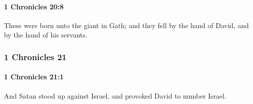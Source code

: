 		\paragraph{1 Chronicles 20:8} %
			\label{1CHRONICLES-20-8}

			These were born unto the giant in Gath; and they fell by the hand of David, and by the hand of his servants.

	\subsubsection{1 Chronicles 21} %
		\label{1CHRONICLES-21}

		\paragraph{1 Chronicles 21:1} %
			\label{1CHRONICLES-21-1}

			And Satan stood up against Israel, and provoked David to number Israel.

